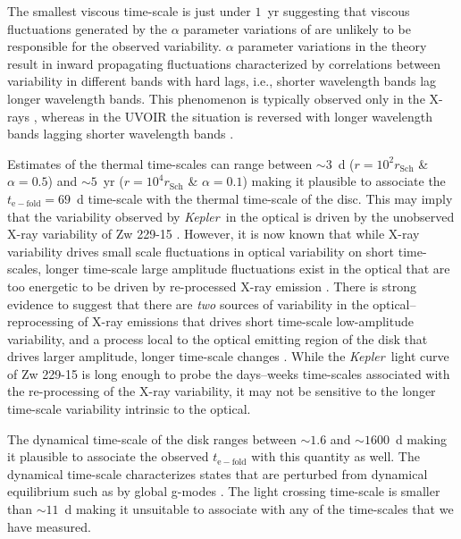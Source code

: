 \documentclass[a4paper,fleqn,usenatbib]{mnras}
\newcommand{\Kepler}{\textit{Kepler~}}
\begin{document}
The smallest viscous time-scale is just under $1$~yr suggesting that viscous fluctuations generated by the $\alpha$ parameter variations of \citet{Lyubarskii97} are unlikely to be responsible for the observed variability. $\alpha$ parameter variations in the \citet{Lyubarskii97} theory result in inward propagating fluctuations characterized by correlations between variability in different bands with hard lags, i.e., shorter wavelength bands lag longer wavelength bands. This phenomenon is typically observed only in the X-rays \citep{Vaughan04,McHardy04b,Arevalo06}, whereas in the UVOIR the situation is reversed with longer wavelength bands lagging shorter wavelength bands \citep{Wanders97,Sergeev05}. 

Estimates of the thermal time-scales can range between $\sim 3$~d ($r = 10^{2} r_{\mathrm{Sch}}$ \& $\alpha = 0.5$) and $\sim 5$~yr ($r = 10^{4} r_{\mathrm{Sch}}$ \& $\alpha = 0.1$) making it plausible to associate the $t_{\mathrm{e-fold}} = 69$~d time-scale with the thermal time-scale of the disc. This may imply that the variability observed by \Kepler in the optical is driven by the unobserved X-ray variability of Zw 229-15 \citep{Krolik91}. However, it is now known that while X-ray variability drives small scale fluctuations in optical variability on short time-scales, longer time-scale large amplitude fluctuations exist in the optical that are too energetic to be driven by re-processed X-ray emission \citep{Uttley03,Arevalo09}. There is strong evidence to suggest that there are \textit{two} sources of variability in the optical--reprocessing of X-ray emissions that drives short time-scale low-amplitude variability, and a process local to the optical emitting region of the disk that drives larger amplitude, longer time-scale changes \citep{Gaskell08}. While the \Kepler light curve of Zw 229-15 is long enough to probe the days--weeks time-scales associated with the re-processing of the X-ray variability, it may not be sensitive to the longer time-scale variability intrinsic to the optical.

The dynamical time-scale of the disk ranges between $\sim 1.6$ and $\sim 1600$~d making it plausible to associate the observed $t_{\mathrm{e-fold}}$ with this quantity as well. The dynamical time-scale characterizes states that are perturbed from dynamical equilibrium such as by global g-modes \citep{ReynoldsMiller09a,ReynoldsMiller09b}. The light crossing time-scale is smaller than $\sim 11$~d making it unsuitable to associate with any of the time-scales that we have measured.  
\end{document}

